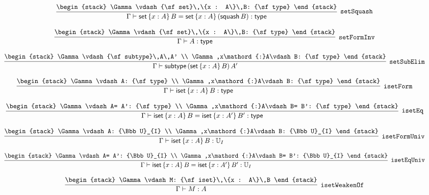 \[
\infer[{\tt setSquash}]{\Gamma \vdash {\sf set}\,\{x : A\}\,B= {\sf set}\,\{x : A\}\,({\sf squash}\,B): {\sf type}}{
\begin{stack}
\Gamma \vdash {\sf set}\,\{x : A\}\,B: {\sf type}
\end{stack}}
\]

\[
\infer[{\tt setFormInv}]{\Gamma \vdash A: {\sf type}}{
\begin{stack}
\Gamma \vdash {\sf set}\,\{x : A\}\,B: {\sf type}
\end{stack}}
\]

\[
\infer[{\tt setSubElim}]{\Gamma \vdash {\sf subtype}\,({\sf set}\,\{x : A\}\,B)\,A'}{
\begin{stack}
\Gamma \vdash {\sf subtype}\,A\,A'
\\
\Gamma ,x\mathord{:}A\vdash B: {\sf type}
\end{stack}}
\]

\[
\infer[{\tt isetForm}]{\Gamma \vdash {\sf iset}\,\{x : A\}\,B: {\sf type}}{
\begin{stack}
\Gamma \vdash A: {\sf type}
\\
\Gamma ,x\mathord{:}A\vdash B: {\sf type}
\end{stack}}
\]

\[
\infer[{\tt isetEq}]{\Gamma \vdash {\sf iset}\,\{x : A\}\,B= {\sf iset}\,\{x : A'\}\,B': {\sf type}}{
\begin{stack}
\Gamma \vdash A= A': {\sf type}
\\
\Gamma ,x\mathord{:}A\vdash B= B': {\sf type}
\end{stack}}
\]

\[
\infer[{\tt isetFormUniv}]{\Gamma \vdash {\sf iset}\,\{x : A\}\,B: {\Bbb U}_{I}}{
\begin{stack}
\Gamma \vdash A: {\Bbb U}_{I}
\\
\Gamma ,x\mathord{:}A\vdash B: {\Bbb U}_{I}
\end{stack}}
\]

\[
\infer[{\tt isetEqUniv}]{\Gamma \vdash {\sf iset}\,\{x : A\}\,B= {\sf iset}\,\{x : A'\}\,B': {\Bbb U}_{I}}{
\begin{stack}
\Gamma \vdash A= A': {\Bbb U}_{I}
\\
\Gamma ,x\mathord{:}A\vdash B= B': {\Bbb U}_{I}
\end{stack}}
\]

\[
\infer[{\tt isetWeakenOf}]{\Gamma \vdash M: A}{
\begin{stack}
\Gamma \vdash M: {\sf iset}\,\{x : A\}\,B
\end{stack}}
\]

